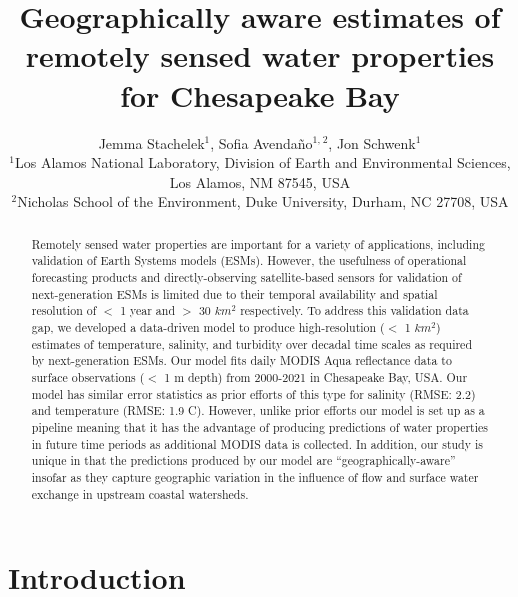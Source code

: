 \documentclass{article}
\title{Geographically aware estimates of remotely sensed water properties for Chesapeake Bay}
\author{Jemma Stachelek$^{1}$, Sofia Avendaño$^{1,}$$^{2}$, Jon Schwenk$^{1}$  \\
        \small $^{1}$Los Alamos National Laboratory, Division of Earth and Environmental Sciences, Los Alamos, NM 87545, USA \\
        \small $^{2}$Nicholas School of the Environment, Duke University, Durham, NC 27708, USA \\
}
\date{}
\begin{document}
\maketitle

\begin{abstract}
    \noindent Remotely sensed water properties are important for a variety of applications, including validation of Earth Systems models (ESMs). However, the usefulness of operational forecasting products and directly-observing satellite-based sensors for validation of next-generation ESMs is limited due to their temporal availability and spatial resolution of $<$ 1 year and $>$ 30 $km^2$ respectively. To address this validation data gap, we developed a data-driven model to produce high-resolution ($<$ 1 $km^2$) estimates of temperature, salinity, and turbidity over decadal time scales as required by next-generation ESMs. Our model fits daily MODIS Aqua reflectance data to surface observations ($<$ 1 m depth) from 2000-2021 in Chesapeake Bay, USA. Our model has similar error statistics as prior efforts of this type for salinity (RMSE: 2.2) and temperature (RMSE: 1.9 C). However, unlike prior efforts our model is set up as a pipeline meaning that it has the advantage of producing predictions of water properties in future time periods as additional MODIS data is collected. In addition, our study is unique in that the predictions produced by our model are “geographically-aware” insofar as they capture geographic variation in the influence of flow and surface water exchange in upstream coastal watersheds.
    \end{abstract} \hspace{10pt}

\linenumbers

\section{Introduction}
\end{document}
